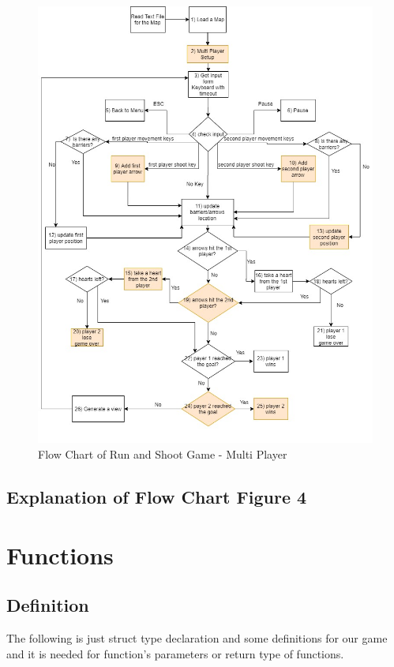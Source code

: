 \begin{figure} 
       
        \centering \includegraphics[width=\columnwidth]{Run_and_shoot-MULTI_PLAYER.jpg}
        \caption{
        Flow Chart of Run and Shoot Game - Multi Player}
        \label{fig:multiplayer}
\end{figure}


\subsection{Explanation of Flow Chart Figure 4}





\newpage
\section{Functions}
\subsection{Definition}
The following is just struct type declaration and some definitions for our game and it is needed for function's parameters or return type of functions.

